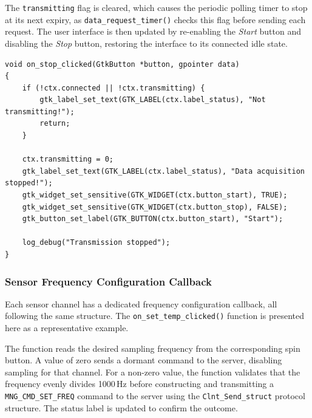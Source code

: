 The \texttt{transmitting} flag is cleared, which causes the periodic
polling timer to stop at its next expiry, as \texttt{data\_request\_timer()}
checks this flag before sending each request. The user interface is then
updated by re-enabling the \textit{Start} button and disabling the
\textit{Stop} button, restoring the interface to its connected idle state.


\begin{verbatim}
void on_stop_clicked(GtkButton *button, gpointer data)
{
    if (!ctx.connected || !ctx.transmitting) {
        gtk_label_set_text(GTK_LABEL(ctx.label_status), "Not transmitting!");
        return;
    }
    
    ctx.transmitting = 0;
    gtk_label_set_text(GTK_LABEL(ctx.label_status), "Data acquisition stopped!");
    gtk_widget_set_sensitive(GTK_WIDGET(ctx.button_start), TRUE);
    gtk_widget_set_sensitive(GTK_WIDGET(ctx.button_stop), FALSE);
    gtk_button_set_label(GTK_BUTTON(ctx.button_start), "Start");

    log_debug("Transmission stopped");
}
\end{verbatim}

\subsubsection{Sensor Frequency Configuration Callback}

Each sensor channel has a dedicated frequency configuration callback,
all following the same structure. The \texttt{on\_set\_temp\_clicked()}
function is presented here as a representative example.

The function reads the desired sampling frequency from the corresponding
spin button. A value of zero sends a dormant command to the server,
disabling sampling for that channel. For a non-zero value, the function
validates that the frequency evenly divides 1000\,Hz before constructing
and transmitting a \texttt{MNG\_CMD\_SET\_FREQ} command to the server
using the \texttt{Clnt\_Send\_struct} protocol structure. The status
label is updated to confirm the outcome.

